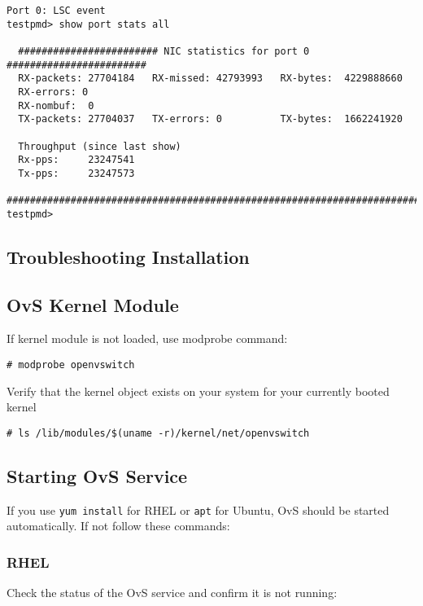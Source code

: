 \documentclass[letter]{article}
\begin{document}
{{{\begin{lstlisting}
Port 0: LSC event
testpmd> show port stats all

  ######################## NIC statistics for port 0  ########################
  RX-packets: 27704184   RX-missed: 42793993   RX-bytes:  4229888660
  RX-errors: 0
  RX-nombuf:  0         
  TX-packets: 27704037   TX-errors: 0          TX-bytes:  1662241920

  Throughput (since last show)
  Rx-pps:     23247541
  Tx-pps:     23247573
  ############################################################################
testpmd>
\end{lstlisting}

}%

\newpage
\begin{appendices}
{\setlength{\parindent}{0cm}

\section{Troubleshooting Installation}
\label{appendix:install}
\subsection{OvS Kernel Module}
If kernel module is not loaded, use modprobe command:
\begin{lstlisting}
# modprobe openvswitch
\end{lstlisting}

Verify that the kernel object exists on your system for your currently booted kernel

\begin{lstlisting}
# ls /lib/modules/$(uname -r)/kernel/net/openvswitch
\end{lstlisting}

\subsection{Starting OvS Service}
If you use \texttt{yum install} for RHEL or \texttt{apt} for Ubuntu, OvS should be started automatically. If not follow these commands:

\subsubsection{RHEL}
Check the status of the OvS service and confirm it is not running:

}
\end{appendices}}}
\end{document}
